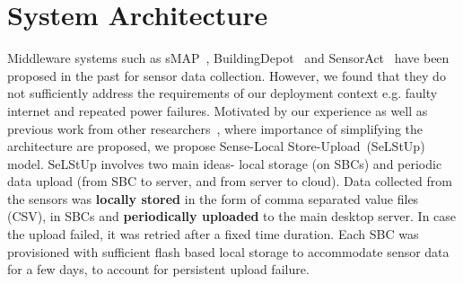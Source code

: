 \documentclass[10pt]{sensys-proc}
\newcommand{\selstup}{SeLStUp}
\newcommand{\paradigms}{Sense-Local Store-Upload~}
\newcommand{\selstups}{SeLStUp }
\begin{document}
\section{System Architecture}	
\label{sec:architecture}
Middleware systems such as sMAP~\cite{smap}, BuildingDepot~\cite{buildingdepot} and SensorAct~\cite{Arjunan12} have been proposed in the past for sensor data collection. However, we found that they do not sufficiently address the requirements of our deployment context e.g. faulty internet and repeated power failures. Motivated by our experience as well as previous work from other researchers~\cite{hitchhiker_residential}, where importance of simplifying the architecture are proposed, we propose \paradigms (\selstup) model. \selstups involves two main ideas- local storage (on SBCs) and periodic data upload (from SBC to server, and from server to cloud). Data collected from the sensors was \textbf{locally stored} in the form of comma separated value files (CSV), in SBCs and \textbf{periodically uploaded} to the main desktop server. In case the upload failed, it was retried after a fixed time duration. Each SBC was provisioned with sufficient flash based local storage to accommodate sensor data for a few days, to account for persistent upload failure.
\end{document}
